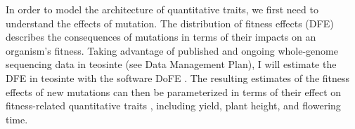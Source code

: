 In order to model the architecture of quantitative traits, we first need to understand the effects of mutation. The distribution of fitness effects (DFE) describes the consequences of mutations in terms of their impacts on an organism's fitness. Taking advantage of published \citep{Chia:2012} and ongoing whole-genome sequencing data in teosinte (see Data Management Plan), I will estimate the DFE in teosinte with the software DoFE \citep{Keightley:2007hq, Stoletzki:2011}.%
The resulting estimates of the fitness effects of new mutations can then be parameterized in terms of their effect on fitness-related quantitative traits \citep{Keightley:1988, eyre-walker:2010}, including yield, plant height, and flowering time.



